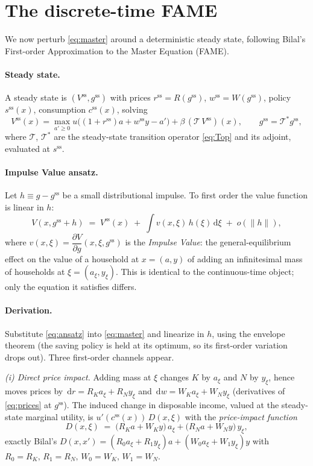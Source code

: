 \documentclass[11pt]{article}
\newcommand{\Tr}{\mathcal{T}}
\newcommand{\Tstar}{\mathcal{T}^{*}}
\newcommand{\gss}{g^{\mathrm{ss}}}
\newcommand{\Vss}{V^{\mathrm{ss}}}
\newcommand{\css}{c^{\mathrm{ss}}}
\newcommand{\sss}{s^{\mathrm{ss}}}
\newcommand{\dd}{\,\mathrm{d}}
\begin{document}
\section{The discrete-time FAME}

We now perturb \eqref{eq:master} around a deterministic steady state, following
Bilal's First-order Approximation to the Master Equation (FAME).

\paragraph{Steady state.}
A steady state is $(\Vss,\gss)$ with prices $r^{\mathrm{ss}}=R(\gss)$,
$w^{\mathrm{ss}}=W(\gss)$, policy $\sss(x)$, consumption $\css(x)$, solving
\[
  \Vss(x)=\max_{a'\ge0} u\big((1+r^{\mathrm{ss}})a+w^{\mathrm{ss}}y-a'\big)+\beta\,(\Tr\,\Vss)(x),
  \qquad \gss=\Tstar\gss,
\]
where $\Tr$, $\Tstar$ are the steady-state transition operator \eqref{eq:Top} and its
adjoint, evaluated at $\sss$.

\paragraph{Impulse Value ansatz.}
Let $h\equiv g-\gss$ be a small distributional impulse. To first order the value
function is linear in $h$:
\begin{equation}\label{eq:ansatz}
  V(x,\gss+h)\;=\;\Vss(x)\;+\;\int v(x,\xi)\,h(\xi)\dd\xi \;+\;o(\|h\|),
\end{equation}
where $v(x,\xi)=\dfrac{\partial V}{\partial g}(x,\xi,\gss)$ is the \emph{Impulse
Value}: the general-equilibrium effect on the value of a household at $x=(a,y)$ of
adding an infinitesimal mass of households at $\xi=(a_\xi,y_\xi)$. This is identical
to the continuous-time object; only the equation it satisfies differs.

\paragraph{Derivation.}
Substitute \eqref{eq:ansatz} into \eqref{eq:master} and linearize in $h$, using the
envelope theorem (the saving policy is held at its optimum, so its first-order
variation drops out). Three first-order channels appear.

\emph{(i) Direct price impact.} Adding mass at $\xi$ changes $K$ by $a_\xi$ and $N$ by
$y_\xi$, hence moves prices by $\dd r=R_K a_\xi+R_N y_\xi$ and
$\dd w=W_K a_\xi+W_N y_\xi$ (derivatives of \eqref{eq:prices} at $\gss$). The induced
change in disposable income, valued at the steady-state marginal utility, is
$u'(\css(x))\,D(x,\xi)$ with the \emph{price-impact function}
\begin{equation}\label{eq:D}
  D(x,\xi)\;=\;\big(R_K a+W_K y\big)\,a_\xi+\big(R_N a+W_N y\big)\,y_\xi,
\end{equation}
exactly Bilal's $D(x,x')=(R_0 a_\xi+R_1 y_\xi)a+(W_0 a_\xi+W_1 y_\xi)y$ with
$R_0=R_K,\,R_1=R_N,\,W_0=W_K,\,W_1=W_N$.
\end{document}
